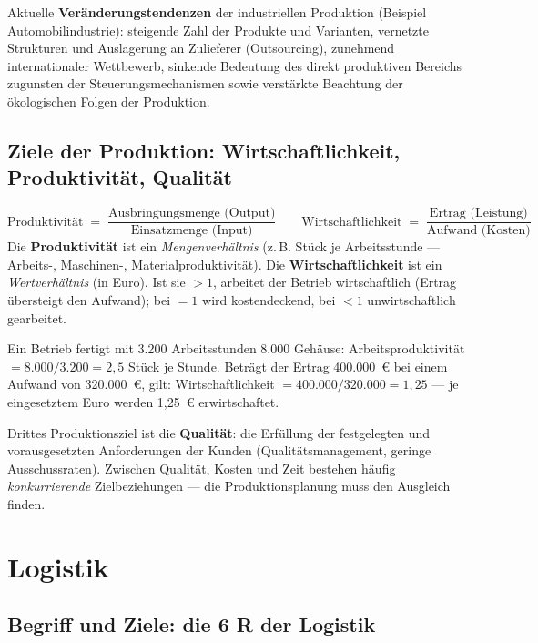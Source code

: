 \documentclass[11pt, a4paper]{article}
\begin{document}
Aktuelle \textbf{Veränderungstendenzen} der industriellen Produktion (Beispiel
Automobilindustrie): steigende Zahl der Produkte und Varianten, vernetzte Strukturen und
Auslagerung an Zulieferer (Outsourcing), zunehmend internationaler Wettbewerb, sinkende
Bedeutung des direkt produktiven Bereichs zugunsten der Steuerungsmechanismen sowie
verstärkte Beachtung der ökologischen Folgen der Produktion.

\subsection{Ziele der Produktion: Wirtschaftlichkeit, Produktivität, Qualität}

\begin{merksatz}[title={\bfseries Formeln: Produktivität und Wirtschaftlichkeit}]
\[
\text{Produktivität} \;=\; \frac{\text{Ausbringungsmenge (Output)}}{\text{Einsatzmenge (Input)}}
\qquad
\text{Wirtschaftlichkeit} \;=\; \frac{\text{Ertrag (Leistung)}}{\text{Aufwand (Kosten)}}
\]
Die \textbf{Produktivität} ist ein \emph{Mengenverhältnis} (z.\,B. Stück je
Arbeitsstunde --- Arbeits-, Maschinen-, Materialproduktivität). Die
\textbf{Wirtschaftlichkeit} ist ein \emph{Wertverhältnis} (in Euro). Ist sie
$> 1$, arbeitet der Betrieb wirtschaftlich (Ertrag übersteigt den Aufwand); bei
$= 1$ wird kostendeckend, bei $< 1$ unwirtschaftlich gearbeitet.
\end{merksatz}

\begin{beispiel}
Ein Betrieb fertigt mit 3.200 Arbeitsstunden 8.000 Gehäuse: Arbeitsproduktivität
$= 8.000 / 3.200 = 2{,}5$ Stück je Stunde. Beträgt der Ertrag 400.000~€ bei einem
Aufwand von 320.000~€, gilt: Wirtschaftlichkeit $= 400.000 / 320.000 = 1{,}25$ --- je
eingesetztem Euro werden 1,25~€ erwirtschaftet.
\end{beispiel}

Drittes Produktionsziel ist die \textbf{Qualität}: die Erfüllung der festgelegten und
vorausgesetzten Anforderungen der Kunden (Qualitätsmanagement, geringe Ausschussraten).
Zwischen Qualität, Kosten und Zeit bestehen häufig \emph{konkurrierende}
Zielbeziehungen --- die Produktionsplanung muss den Ausgleich finden.

\section{Logistik}

\subsection{Begriff und Ziele: die 6 R der Logistik}
\end{document}
